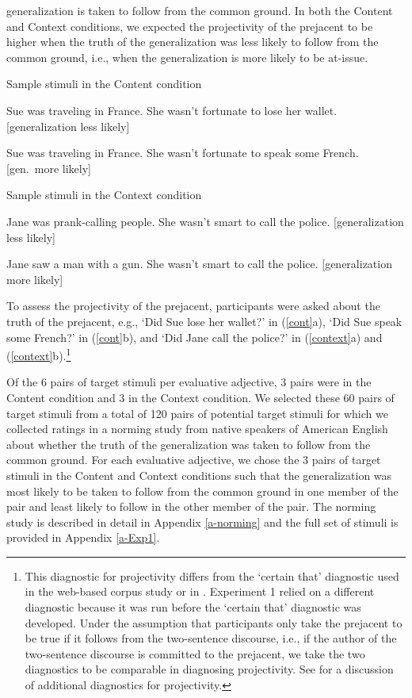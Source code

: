 \documentclass[11pt,fleqn]{article}
\newcommand{\6}{\mbox{$[\hspace*{-.6mm}[$}}
\newcommand{\9}{\mbox{$]\hspace*{-.6mm}]$}}
\begin{document}
generalization is taken to follow from the common ground. In both the Content and Context conditions, we expected the projectivity of the prejacent to be higher when the truth of the generalization was less likely to follow from the common ground, i.e., when the generalization is more likely to be at-issue.

\begin{exe}
\ex\label{cont} Sample stimuli in the Content condition 

\begin{xlist}
\ex Sue was traveling in France. She wasn't fortunate to lose her wallet.  \hfill [generalization less likely]

\ex Sue was traveling in France. She wasn't fortunate to speak some French. \hfill [gen.\ more likely]
\end{xlist}

\ex\label{context} Sample stimuli in the Context condition

\begin{xlist}
\ex Jane was prank-calling people. She wasn't smart to call the police. \hfill [generalization less likely]

\ex Jane saw a man with a gun. She wasn't smart to call the police. \hfill [generalization more likely]
\end{xlist}
\end{exe}
To assess the projectivity of the prejacent, participants were asked about the truth of the prejacent, e.g., `Did Sue lose her wallet?' in (\ref{cont}a), `Did Sue speak some French?' in (\ref{cont}b), and `Did Jane call the police?' in (\ref{context}a) and (\ref{context}b).\footnote{This diagnostic for projectivity differs from the `certain that' diagnostic used in the web-based corpus study or in \citealt{tbd-variability}. Experiment 1 relied on a different diagnostic because it was run before the `certain that' diagnostic was developed. Under the assumption that participants only take the prejacent to be true if it follows from the two-sentence discourse, i.e., if the author of the two-sentence discourse is committed to the prejacent, we take the two diagnostics to be comparable in diagnosing projectivity. See \citealt{tbd-variability} for a discussion of additional diagnostics for projectivity.}

Of the 6 pairs of target stimuli per evaluative adjective, 3 pairs were in the Content condition and 3 in the Context condition. We selected these 60 pairs of target stimuli from a total of 120 pairs of potential target stimuli for which we collected ratings in a norming study from native speakers of American English about whether the truth of the generalization was taken to follow from the common ground. For each evaluative adjective, we chose the 3 pairs of target stimuli in the Content and Context conditions such that the generalization was most likely to be taken to follow from the common ground in one member of the pair and least likely to follow in the other member of the pair. The norming study is described in detail in Appendix \ref{a-norming} and the full set of stimuli is provided in Appendix \ref{a-Exp1}.
\end{document}
